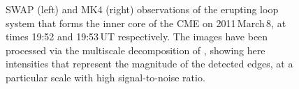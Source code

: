 \documentclass[preprint2]{aastex}
\begin{document}



\begin{figure}[ht]
\caption{SWAP (left) and MK4 (right) observations of the erupting loop system that forms the inner core of the CME on 2011\,March\,8, at times 19:52 and 19:53\,UT respectively. The images have been processed via the multiscale decomposition of \citet{2008SoPh..248..457Y}, showing here intensities that represent the magnitude of the detected edges, at a particular scale with high signal-to-noise ratio.}
\label{plot_heights_inner}
\end{figure}
\end{document}
